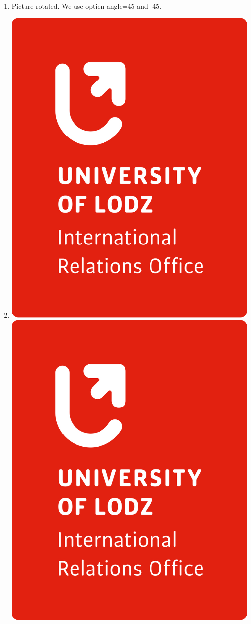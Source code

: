 \documentclass{article}
\begin{document}
\begin{enumerate}
  \item Picture rotated. We use option angle=45 and -45.
  \item[] \includegraphics[scale=0.1,angle=45]{img/logo-1.jpg} \hspace{2mm} \includegraphics[scale=0.1,angle=-45]{img/logo-1.jpg}
\end{enumerate}
\end{document}
